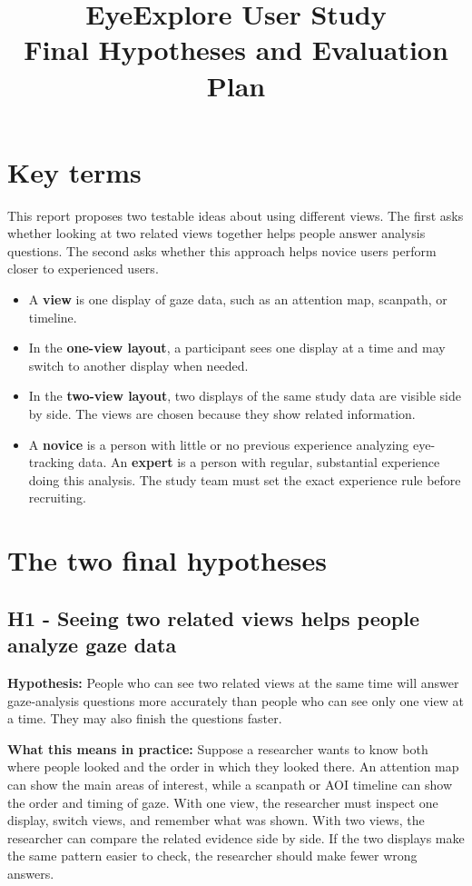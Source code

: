 \documentclass[11pt]{article}
\title{\textcolor{eyeblue}{EyeExplore User Study}\\
\large Final Hypotheses and Evaluation Plan}
\author{}
\date{}
\begin{document}
\maketitle

\section{Key terms}
This report proposes two testable ideas about using different views. The first asks
whether looking at two related views together helps people answer analysis
questions. The second asks whether this approach helps novice users perform
closer to experienced users. 

\begin{itemize}
  \item A \textbf{view} is one display of gaze data, such as an attention map,
  scanpath, or timeline.
  \item In the \textbf{one-view layout}, a participant sees one display at a
  time and may switch to another display when needed.
  \item In the \textbf{two-view layout}, two displays of the same study data
  are visible side by side. The views are chosen because they show related
  information.
  \item A \textbf{novice} is a person with little or no previous experience
  analyzing eye-tracking data. An \textbf{expert} is a person with regular,
  substantial experience doing this analysis. The study team must set the exact
  experience rule before recruiting.
\end{itemize}

\section{The two final hypotheses}

\subsection*{H1 - Seeing two related views helps people analyze gaze data}
\textbf{Hypothesis:} People who can see two related views at the same time will
answer gaze-analysis questions more accurately than people who can see only
one view at a time. They may also finish the questions faster.

\textbf{What this means in practice:} Suppose a researcher wants to know both
where people looked and the order in which they looked there. An attention map
can show the main areas of interest, while a scanpath or AOI timeline can show
the order and timing of gaze. With one view, the researcher must inspect one
display, switch views, and remember what was shown. With two views, the
researcher can compare the related evidence side by side. If the two displays
make the same pattern easier to check, the researcher should make fewer wrong
answers.
\end{document}

